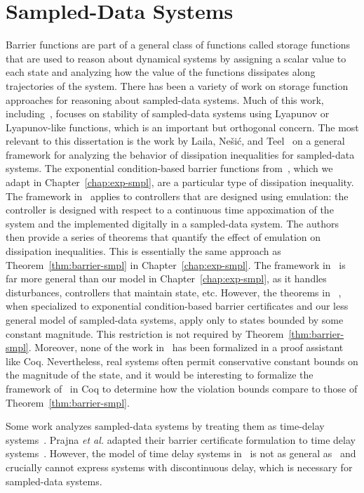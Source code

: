 \section{Sampled-Data Systems}
\label{sec:related-sampled}
Barrier functions are part of a general class of functions called storage
functions~\cite{Willems1972} that are used to reason about dynamical
systems by assigning a scalar value to each state and analyzing how the
value of the functions dissipates along trajectories of the system.  There
has been a variety of work on storage function approaches for reasoning
about sampled-data systems.  Much of this work,
including~\cite{chen1991input,seuret13sampled}, focuses on stability of
sampled-data systems using Lyapunov or Lyapunov-like functions, which is an
important but orthogonal concern. The most relevant to this dissertation is
the work by Laila, Nešić, and Teel~\cite{laila02sampled} on a general
framework for analyzing the behavior of dissipation inequalities for
sampled-data systems. The exponential condition-based barrier functions
from~\cite{kong2013barrier}, which we adapt in Chapter~\ref{chap:exp-smpl},
are a particular type of dissipation inequality. The framework
in~\cite{laila02sampled} applies to controllers that are designed using
emulation: the controller is designed with respect to a continuous time
appoximation of the system and the implemented digitally in a sampled-data
system. The authors then provide a series of theorems that quantify the
effect of emulation on dissipation inequalities. This is essentially the
same approach as Theorem~\ref{thm:barrier-smpl} in
Chapter~\ref{chap:exp-smpl}. The framework in~\cite{laila02sampled} is far
more general than our model in Chapter~\ref{chap:exp-smpl}, as it handles
disturbances, controllers that maintain state, etc. However, the theorems
in ~\cite{laila02sampled}, when specialized to exponential condition-based
barrier certificates and our less general model of sampled-data systems,
apply only to states bounded by some constant magnitude. This restriction
is not required by Theorem~\ref{thm:barrier-smpl}. Moreover, none of the
work in~\cite{laila02sampled} has been formalized in a proof assistant like
Coq. Nevertheless, real systems often permit conservative constant bounds
on the magnitude of the state, and it would be interesting to formalize the
framework of~\cite{laila02sampled} in Coq to determine how the violation
bounds compare to those of Theorem~\ref{thm:barrier-smpl}.

Some work analyzes sampled-data systems by treating them as time-delay
systems~\cite{Fridman04delay}.  Prajna \emph{et al.} adapted their barrier
certificate formulation to time delay
systems~\cite{prajna05delay}. However, the model of time delay systems
in~\cite{prajna05delay} is not as general as~\cite{Fridman04delay} and
crucially cannot express systems with discontinuous delay, which is
necessary for sampled-data systems.


